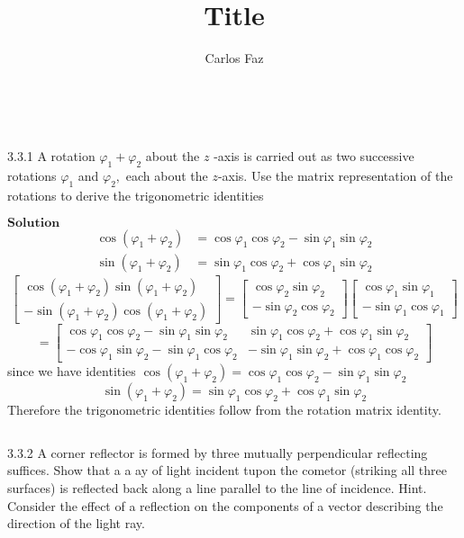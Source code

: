 \documentclass{article}
\title{Title}
\author{Carlos Faz}
\date{ \ }
\begin{document}
\begin{flushleft}

\begin{mybox}{3.3.1}
A rotation $\varphi_{1}+\varphi_{2}$ about the $z$ -axis is carried out as two successive rotations $\varphi_{1}$ and $\varphi_{2},$ each about the $z$-axis. Use the matrix representation of the rotations to derive the trigonometric identities
\end{mybox}
$\boxed{\textbf{Solution}}$
$$
\begin{aligned} \cos \left(\varphi_{1}+\varphi_{2}\right) &=\cos \varphi_{1} \cos \varphi_{2}-\sin \varphi_{1} \sin \varphi_{2} \\ \sin \left(\varphi_{1}+\varphi_{2}\right) &=\sin \varphi_{1} \cos \varphi_{2}+\cos \varphi_{1} \sin \varphi_{2} \end{aligned}
$$
$$\begin{bmatrix}{\cos \left(\varphi_{1}+\varphi_{2}\right) \sin \left(\varphi_{1}+\varphi_{2}\right)} \\ {-\sin \left(\varphi_{1}+\varphi_{2}\right) \cos \left(\varphi_{1}+\varphi_{2}\right)}\end{bmatrix}=\begin{bmatrix}{\cos \varphi_{2} \sin \varphi_{2}} \\ {-\sin \varphi_{2} \cos \varphi_{2}}\end{bmatrix}\begin{bmatrix}{\cos \varphi_{1} \sin \varphi_{1}} \\ {-\sin \varphi_{1} \cos \varphi_{1}}\end{bmatrix}$$
$$=\begin{bmatrix}{\cos \varphi_{1} \cos \varphi_{2}-\sin \varphi_{1} \sin \varphi_{2}} & {\sin \varphi_{1} \cos \varphi_{2}+\cos \varphi_{1} \sin \varphi_{2}} \\ {-\cos \varphi_{1} \sin \varphi_{2}-\sin \varphi_{1} \cos \varphi_{2}} & {-\sin \varphi_{1} \sin \varphi_{2}+\cos \varphi_{1} \cos \varphi_{2}}\end{bmatrix}$$
since we have identities $\cos \left(\varphi_{1}+\varphi_{2}\right)=\cos \varphi_{1} \cos \varphi_{2}-\sin \varphi_{1} \sin \varphi_{2}$
$$
\sin \left(\varphi_{1}+\varphi_{2}\right)=\sin \varphi_{1} \cos \varphi_{2}+\cos \varphi_{1} \sin \varphi_{2}
$$
Therefore the trigonometric identities follow from the rotation matrix identity.


$$$$

\begin{mybox}{3.3.2}
A corner reflector is formed by three mutually perpendicular reflecting suffices. Show that a a ay of light incident tupon the cometor (striking all three surfaces) is reflected back along a line parallel to the line of incidence. Hint. Consider the effect of a reflection on the components of a vector describing the direction of the light ray.
\end{mybox}


\end{flushleft}
\end{document}
